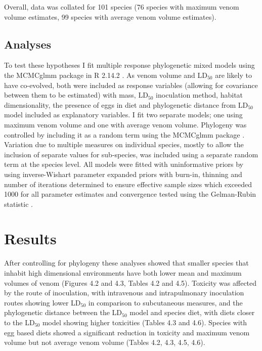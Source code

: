Overall, data was collated for 101 species (76 species with maximum venom volume estimates, 99 species with average venom volume estimates).


\subsection{Analyses}

To test these hypotheses I fit multiple response phylogenetic mixed models using the MCMCglmm package \citep{hadfield2010mcmc} in R 2.14.2 \citep{RCran}. As venom volume and LD$_{50}$ are likely to have co-evolved, both were included as response variables (allowing for covariance between them to be estimated) with mass, LD$_{50}$ inoculation method, habitat dimensionality, the presence of eggs in diet and phylogenetic distance from LD$_{50}$ model included as explanatory variables. I fit two separate models; one using maximum venom volume and one with average venom volume. Phylogeny was controlled by including it as a random term using the MCMCglmm package \citep{hadfield2010mcmc}. Variation due to multiple measures on individual species, mostly to allow the inclusion of separate values for sub-species, was included using a separate random term at the species level. All models were fitted with uninformative priors by using inverse-Wishart parameter expanded priors \citep{hadfield2010mcmc} with burn-in, thinning and number of iterations determined to ensure effective sample sizes which exceeded 1000 for all parameter estimates and convergence tested using the Gelman-Rubin statistic \citep{gelman1992inference}. 

\section{Results}

After controlling for phylogeny these analyses showed that smaller species that inhabit high dimensional environments have both lower mean and maximum volumes of venom (Figures 4.2 and 4.3, Tables 4.2 and 4.5). Toxicity was affected by the route of inoculation, with intravenous and intrapulmonary inoculation routes showing lower LD$_{50}$ in comparison to subcutaneous measures, and the phylogenetic distance between the LD$_{50}$ model and species diet, with diets closer to the LD$_{50}$ model showing higher toxicities (Tables 4.3 and 4.6). Species with egg based diets showed a significant reduction in toxicity and maximum venom volume but not average venom volume (Tables 4.2, 4.3, 4.5, 4.6).




